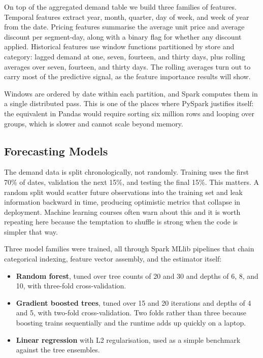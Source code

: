 \documentclass[11pt,a4paper]{article}
\begin{document}
On top of the aggregated demand table we build three families of features. Temporal features extract year, month, quarter, day of week, and week of year from the date. Pricing features summarise the average unit price and average discount per segment-day, along with a binary flag for whether any discount applied. Historical features use window functions partitioned by store and category: lagged demand at one, seven, fourteen, and thirty days, plus rolling averages over seven, fourteen, and thirty days. The rolling averages turn out to carry most of the predictive signal, as the feature importance results will show.

Windows are ordered by date within each partition, and Spark computes them in a single distributed pass. This is one of the places where PySpark justifies itself: the equivalent in Pandas would require sorting six million rows and looping over groups, which is slower and cannot scale beyond memory.

\subsection{Forecasting Models}

The demand data is split chronologically, not randomly. Training uses the first 70\% of dates, validation the next 15\%, and testing the final 15\%. This matters. A random split would scatter future observations into the training set and leak information backward in time, producing optimistic metrics that collapse in deployment. Machine learning courses often warn about this and it is worth repeating here because the temptation to shuffle is strong when the code is simpler that way.

Three model families were trained, all through Spark MLlib pipelines that chain categorical indexing, feature vector assembly, and the estimator itself:

\begin{itemize}[leftmargin=1.5em]
\item \textbf{Random forest}, tuned over tree counts of 20 and 30 and depths of 6, 8, and 10, with three-fold cross-validation.
\item \textbf{Gradient boosted trees}, tuned over 15 and 20 iterations and depths of 4 and 5, with two-fold cross-validation. Two folds rather than three because boosting trains sequentially and the runtime adds up quickly on a laptop.
\item \textbf{Linear regression} with L2 regularisation, used as a simple benchmark against the tree ensembles.
\end{itemize}
\end{document}
